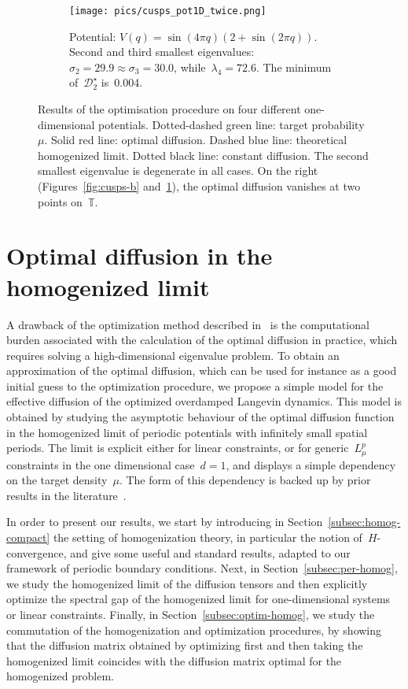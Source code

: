 \documentclass{article}
\def\T{\mathbb{T}}
\newcommand{\Diff}{\mathcal{D}}
\renewcommand{\dim}{d}
\begin{document}
\begin{figure}
\begin{subfigure}[t]{0.49\linewidth}
\texttt{[image: pics/cusps\_pot1D\_twice.png]}
\caption{Potential: $V(q) =  \sin(4\pi q) (2 + \sin(2\pi q))$. Second and third smallest eigenvalues: $\sigma_2 = 29.9 \approx \sigma_3 = 30.0$, while~$\lambda_4 = 72.6$. The minimum of~$\Diff^{\star}_2$ is~0.004.}
\label{fig:cusps-d}
\end{subfigure}
\caption{Results of the optimisation procedure on four different one-dimensional potentials. Dotted-dashed green line: target probability $\mu$. Solid red line: optimal diffusion. Dashed blue line: theoretical homogenized limit. Dotted black line: constant diffusion. The second smallest eigenvalue is degenerate in all cases. On the right (Figures~\ref{fig:cusps-b} and~\ref{fig:cusps-d}), the optimal diffusion vanishes at two points on~$\T$.}
\label{fig:cusps}
\end{figure}

\section{Optimal diffusion in the homogenized limit}
\label{sec:homog}

A drawback of the optimization method described in~ is the computational burden associated with the calculation of the optimal diffusion in practice, which requires solving a high-dimensional eigenvalue problem. To obtain an approximation of the optimal diffusion, which can be used for instance as a good initial guess to the optimization procedure, we propose a simple model for the effective diffusion of the optimized overdamped Langevin dynamics. This model is obtained by studying the asymptotic behaviour of the optimal diffusion function in the homogenized limit of periodic potentials with infinitely small spatial periods. The limit is explicit either for linear constraints, or for generic~$L^p_\mu$ constraints in the one dimensional case~$\dim=1$, and displays a simple dependency on the target density~$\mu$. The form of this dependency is backed up by prior results in the literature~\cite{RobertsStramer}. 

In order to present our results, we start by introducing in Section~\ref{subsec:homog-compact} the setting of homogenization theory, in particular the notion of~$H$-convergence, and give some useful and standard results, adapted to our framework of periodic boundary conditions. Next, in Section~\ref{subsec:per-homog}, we study the homogenized limit of the diffusion tensors and then explicitly optimize the spectral gap of the homogenized limit for one-dimensional systems or linear constraints. Finally, in Section~\ref{subsec:optim-homog}, we study the commutation of the homogenization and optimization procedures, by showing that the diffusion matrix obtained by optimizing first and then taking the homogenized limit coincides with the diffusion matrix optimal for the homogenized problem.
\end{document}
